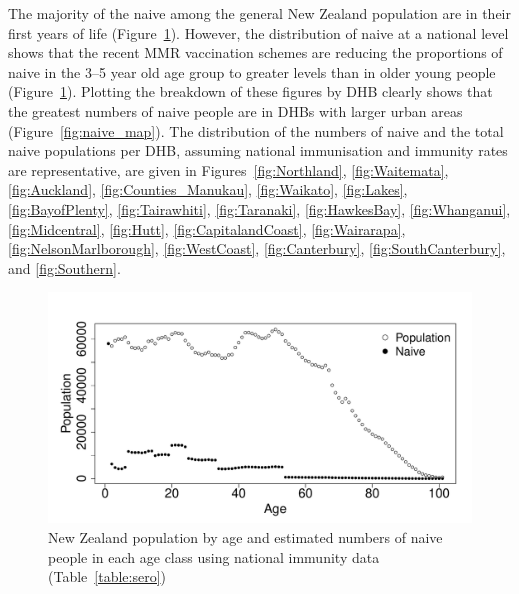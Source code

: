 \documentclass{article}
\begin{document}
The majority of the naive among the general New Zealand population are in their first years of life (Figure~\ref{fig:naive}). However, the distribution of naive at a national level shows that the recent MMR vaccination schemes are reducing the proportions of naive in the 3--5 year old age group to greater levels than in older young people  (Figure~\ref{fig:naive}). Plotting the breakdown of these figures by DHB clearly shows that the greatest numbers of naive people are in DHBs with larger urban areas (Figure~\ref{fig:naive_map}). The distribution of the numbers of naive and the total naive populations per DHB, assuming national immunisation and immunity rates are representative, are given in Figures~\ref{fig:Northland}, \ref{fig:Waitemata}, \ref{fig:Auckland}, \ref{fig:Counties_Manukau}, \ref{fig:Waikato}, \ref{fig:Lakes}, \ref{fig:BayofPlenty}, \ref{fig:Tairawhiti}, \ref{fig:Taranaki}, \ref{fig:HawkesBay}, \ref{fig:Whanganui}, \ref{fig:Midcentral}, \ref{fig:Hutt}, \ref{fig:CapitalandCoast}, \ref{fig:Wairarapa}, \ref{fig:NelsonMarlborough}, \ref{fig:WestCoast}, \ref{fig:Canterbury}, \ref{fig:SouthCanterbury}, and \ref{fig:Southern}.



\begin{figure}
\begin{center}
\includegraphics{draftfinalreport-023}
\end{center}
\caption{New Zealand population by age and estimated numbers of naive people in each age class using national immunity data (Table~\ref{table:sero})}
\label{fig:naive}
\end{figure}
\end{document}
